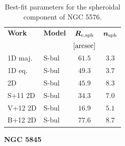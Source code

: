 \documentclass[preprint2]{emulateapj}
\begin{document}
  \begin{table}[h]
  \small
  \caption{Best-fit parameters for the spheroidal component of NGC 5576.}
  \begin{center}
  \begin{tabular}{llcc}
  \hline
  {\bf Work} & {\bf Model}   & $\bm R_{\rm e,sph}$    & $\bm n_{\rm sph}$ \\
    &  &  $[\rm arcsec]$ & \\
  \hline
  1D maj. & S-bul  & $61.5$  &  $3.3$ \\
  1D eq.  & S-bul  & $49.3$  &  $3.7$ \\
  2D      & S-bul  & $45.9$  &  $8.3$ \\
  \hline
  S+11 2D      & S-bul & $34.3$  &  $7.0$ \\
  V+12 2D      & S-bul & $16.9$  &  $5.1$ \\
  B+12 2D      & S-bul & $77.6$  &  $8.7$ \\
  \hline
  \end{tabular}
  \end{center}
  \label{tab:n5845}
  \end{table}

  \clearpage\newpage\noindent
  {\bf NGC 5845 \\}
\end{document}
